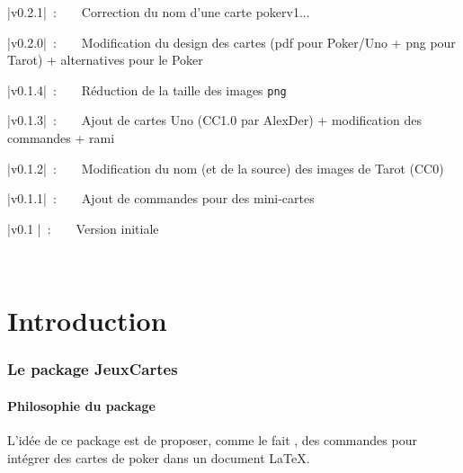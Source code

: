 \documentclass{article}
\newcommand\ctex[1]{\tcbox[vignettelatex]{#1}}
\begin{document}
{\small \bverb|v0.2.1|~:~~~~Correction du nom d'une carte pokerv1...

{\small \bverb|v0.2.0|~:~~~~Modification du design des cartes (pdf pour Poker/Uno + png pour Tarot) + alternatives pour le Poker

{\small \bverb|v0.1.4|~:~~~~Réduction de la taille des images \texttt{png}

{\small \bverb|v0.1.3|~:~~~~Ajout de cartes Uno (CC1.0 par AlexDer) + modification des commandes + rami

{\small \bverb|v0.1.2|~:~~~~Modification du nom (et de la source) des images de Tarot (CC0)

{\small \bverb|v0.1.1|~:~~~~Ajout de commandes pour des mini-cartes

{\small \bverb|v0.1  |~:~~~~Version initiale

\vfill~

\newpage

\part*{Introduction}

\section{Le package JeuxCartes}

\subsection{\og Philosophie \fg{} du package}

\begin{codeidee}
L'idée de ce package est de proposer, comme le fait \ctex{pst-poker}, des commandes pour intégrer des cartes de poker dans un document \LaTeX.


\end{codeidee}}}}}}}}
\end{document}
